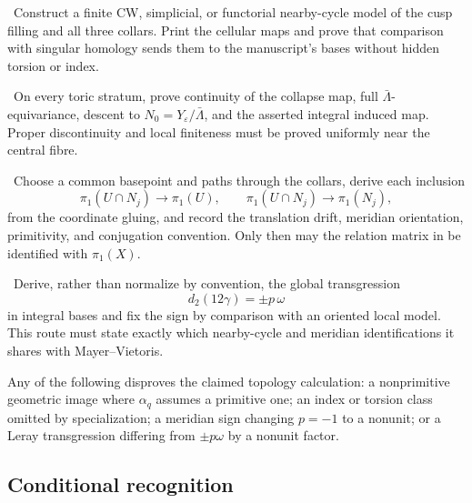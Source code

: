 \begin{obligation}\label{obl:finite-model}
\Open\ Construct a finite CW, simplicial, or functorial nearby-cycle model of the cusp filling and all three collars. Print the cellular maps and prove that comparison with singular homology sends them to the manuscript's bases without hidden torsion or index.
\end{obligation}

\begin{obligation}\label{obl:cusp-collapse}
\Open\ On every toric stratum, prove continuity of the collapse map, full $\bar\Lambda$-equivariance, descent to $N_0=Y_\varepsilon/\bar\Lambda$, and the asserted integral induced map. Proper discontinuity and local finiteness must be proved uniformly near the central fibre.
\end{obligation}

\begin{obligation}\label{obl:vankampen}
\Open\ Choose a common basepoint and paths through the collars, derive each inclusion
\[
\pi_1(U\cap N_j)\longrightarrow\pi_1(U),\qquad
\pi_1(U\cap N_j)\longrightarrow\pi_1(N_j),
\]
from the coordinate gluing, and record the translation drift, meridian orientation, primitivity, and conjugation convention. Only then may the relation matrix in  be identified with $\pi_1(X)$.
\end{obligation}

\begin{obligation}\label{obl:leray}
\Open\ Derive, rather than normalize by convention, the global transgression
\[
d_2(12\gamma)=\pm p\,\omega
\]
in integral bases and fix the sign by comparison with an oriented local model. This route must state exactly which nearby-cycle and meridian identifications it shares with Mayer--Vietoris.
\end{obligation}

\begin{test}
Any of the following disproves the claimed topology calculation: a nonprimitive geometric image where $\alpha_q$ assumes a primitive one; an index or torsion class omitted by specialization; a meridian sign changing $p=-1$ to a nonunit; or a Leray transgression differing from $\pm p\omega$ by a nonunit factor.
\end{test}

\subsection{Conditional recognition}

